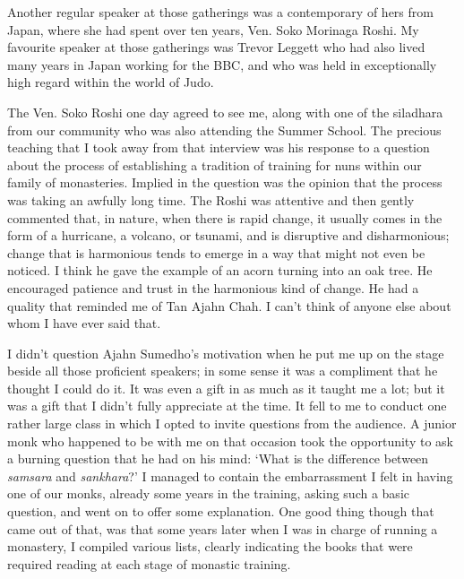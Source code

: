 Another regular speaker at those gatherings was a contemporary of hers
from Japan, where she had spent over ten years, Ven. Soko Morinaga Roshi\cite{soko}.
My favourite speaker at those gatherings was Trevor Leggett\cite{leggett}
who had also lived many years in Japan working for
the BBC, and who was held in exceptionally high regard within the world
of Judo.

The Ven. Soko Roshi one day agreed to see me, along with one of the
siladhara from our community who was also attending the Summer School.
The precious teaching that I took away from that interview was his
response to a question about the process of establishing a tradition of
training for nuns within our family of monasteries. Implied in the
\mbox{question} was the opinion that the process was taking an awfully long
time. The Roshi was attentive and then gently commented that, in nature,
when there is rapid change, it usually comes in the form of a hurricane,
a volcano, or tsunami, and is disruptive and disharmonious; change that
is harmonious tends to emerge in a way that might not even be noticed. I
think he gave the example of an acorn turning into an oak tree. He
encouraged patience and trust in the harmonious kind of change. He had a
quality that reminded me of Tan Ajahn Chah. I can't think of anyone else
about whom I have ever said that.

I didn't question Ajahn Sumedho's motivation when he put me up on the
stage beside all those proficient speakers; in some sense it was a
compliment that he thought I could do it. It was even a gift in as much
as it taught me a lot; but it was a gift that I didn't fully appreciate
at the time. It fell to me to conduct one rather large class in which I
opted to invite questions from the audience. A junior monk who happened
to be with me on that occasion took the opportunity to ask a burning
question that he had on his mind: `What is the difference between
\emph{samsara} and \emph{sankhara}?' I managed to contain the
embarrassment I felt in having one of our monks, already some years in
the training, asking such a basic question, and went on to offer some
explanation. One good thing though that came out of that, was that some
years later when I was in charge of running a monastery, I compiled
various lists, clearly indicating the books that were required reading
at each stage of monastic training.

